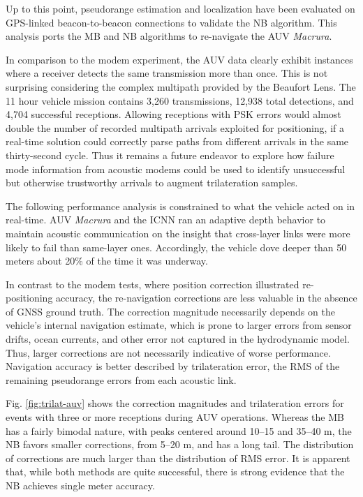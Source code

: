 Up to this point, pseudorange estimation and localization have been evaluated on GPS-linked beacon-to-beacon connections to validate the NB algorithm.
This analysis ports the MB and NB algorithms to re-navigate the AUV \emph{Macrura}.

In comparison to the modem experiment, the AUV data clearly exhibit instances where a receiver detects the same transmission more than once.
This is not surprising considering the complex multipath provided by the Beaufort Lens.
The 11 hour vehicle mission contains 3,260 transmissions, 12,938 total detections, and 4,704 successful receptions.
Allowing receptions with PSK errors would almost double the number of recorded multipath arrivals exploited for positioning, if a real-time solution could correctly parse paths from different arrivals in the same thirty-second cycle.
Thus it remains a future endeavor to explore how failure mode information from acoustic modems could be used to identify unsuccessful but otherwise trustworthy arrivals to augment trilateration samples.

The following performance analysis is constrained to what the vehicle acted on in real-time.
AUV \emph{Macrura} and the ICNN ran an adaptive depth behavior to maintain acoustic communication on the insight that cross-layer links were more likely to fail than same-layer ones.
Accordingly, the vehicle dove deeper than 50 meters about 20\% of the time it was underway.

In contrast to the modem tests, where position correction illustrated re-positioning accuracy, the re-navigation corrections are less valuable in the absence of GNSS ground truth.
The correction magnitude necessarily depends on the vehicle's internal navigation estimate, which is prone to larger errors from sensor drifts, ocean currents, and other error not captured in the hydrodynamic model.
Thus, larger corrections are not necessarily indicative of worse performance.
Navigation accuracy is better described by trilateration error, the RMS of the remaining pseudorange errors from each acoustic link.

Fig. \ref{fig:trilat-auv} shows the correction magnitudes and trilateration errors for events with three or more receptions during AUV operations.
Whereas the MB has a fairly bimodal nature, with peaks centered around 10--15 and 35--40 m, the NB favors smaller corrections, from 5--20 m, and has a long tail.
The distribution of corrections are much larger than the distribution of RMS error.
It is apparent that, while both methods are quite successful, there is strong evidence that the NB achieves single meter accuracy.

